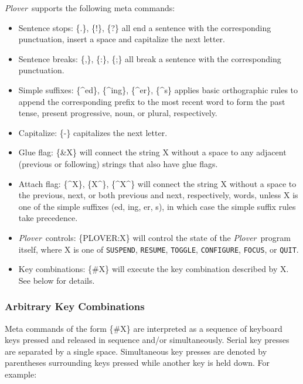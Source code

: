 \documentclass[11pt]{article}
\newcommand{\plover}{\emph{Plover}}
\newcommand{\code}[1]{\texttt{#1}}
\newcommand{\meta}[1]{\{#1\}}
\begin{document}
\plover~supports the following meta commands:
\begin{itemize}

\item Sentence stops: \meta{.}, \meta{!}, \meta{?} all end a sentence
  with the corresponding punctuation, insert a space and capitalize
  the next letter.

\item Sentence breaks: \meta{,}, \meta{:}, \meta{;} all break a
  sentence with the corresponding punctuation.
  
\item Simple suffixes: \meta{\^{ }ed}, \meta{\^{ }ing}, \meta{\^{ }er},
  \meta{\^{ }s} applies basic orthographic rules to append the
  corresponding prefix to the most recent word to form the past tense,
  present progressive, noun, or plural, respectively.

\item Capitalize: \meta{-\textbar} capitalizes the next letter.

\item Glue flag: \meta{\&X} will connect the string X without a space to any
  adjacent (previous or following) strings that also have glue flags.

\item Attach flag: \meta{\^{ }X}, \meta{X\^{ }}, \meta{\^{ }X\^{ }}
  will connect the string X without a space to the previous, next, or
  both previous and next, respectively, words, unless X is one of the
  simple suffixes (ed, ing, er, s), in which case the simple suffix
  rules take precedence.

\item \plover~controls: \meta{PLOVER:X} will control the state of the
  \plover~program itself, where X is one of \code{SUSPEND},
  \code{RESUME}, \code{TOGGLE}, \code{CONFIGURE}, \code{FOCUS}, or
  \code{QUIT}.

\item Key combinations: \meta{\#X} will execute the key combination
  described by X. See below for details.

\end{itemize}

\subsubsection{Arbitrary Key Combinations}

Meta commands of the form \meta{\#X} are interpreted as a sequence of
keyboard keys pressed and released in sequence and/or
simultaneously. Serial key presses are separated by a single
space. Simultaneous key presses are denoted by parentheses surrounding
keys pressed while another key is held down. For example:
\end{document}
